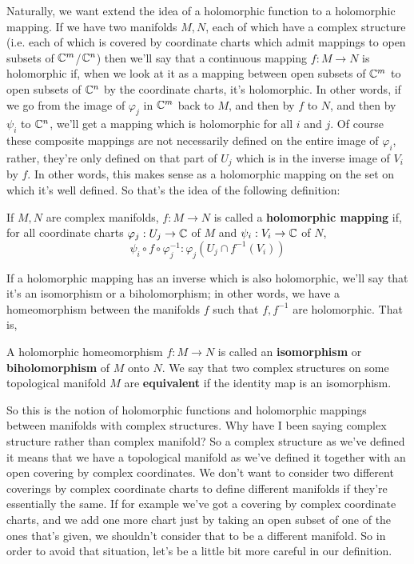 \documentclass{article}
\begin{document}
Naturally, we want extend the idea of a holomorphic function to a holomorphic mapping. If we have two manifolds \(M, N\), each of which have a complex structure (i.e. each of which is covered by coordinate charts which admit mappings to open subsets of \(\mathbb{C}^m\)/\(\mathbb{C}^n\)) then we'll say that a continuous mapping \(f: M \to N\) is holomorphic if, when we look at it as a mapping between open subsets of \(\mathbb{C}^m\) to open subsets of \(\mathbb{C}^n\) by the coordinate charts, it's holomorphic. In other words, if we go from the image of \(\varphi_j\) in \(\mathbb{C}^m\) back to \(M\), and then by \(f\) to \(N\), and then by \(\psi_i\) to \(\mathbb{C}^n\),
we'll get a mapping which is holomorphic for all \(i\) and \(j\). Of course these composite mappings are not necessarily defined on the entire image of \(\varphi_i\), rather, they're only defined on that part of \(U_j\) which is in the inverse image of \(V_i\) by \(f\). In other words, this makes sense as a holomorphic mapping on the set on which it's well defined. So that's the idea of the following definition:

\begin{definition}
If \(M, N\) are complex manifolds, \(f: M \to N\) is called a \textbf{holomorphic mapping} if, for all coordinate charts \(\varphi_j: U_j \to \mathbb{C}\) of \(M\) and \(\psi_i: V_i \to \mathbb{C}\) of \(N\),
\begin{equation}\psi_i \circ f \circ \varphi_j^{-1}: \varphi_j(U_j \cap f^{-1}(V_i))\end{equation}
\end{definition}

If a holomorphic mapping has an inverse which is also holomorphic, we'll say that it's an isomorphism or a biholomorphism; in other words, we have a homeomorphism between the manifolds \(f\) such that \(f, f^{-1}\) are holomorphic. That is,

\begin{definition}
A holomorphic homeomorphism \(f: M \to N\) is called an \textbf{isomorphism} or \textbf{biholomorphism} of \(M\) onto \(N\). We say that two complex structures on some topological manifold \(M\) are \textbf{equivalent} if the identity map is an isomorphism.
\end{definition}

So this is the notion of holomorphic functions and holomorphic mappings between manifolds with complex structures. Why have I been saying complex structure rather than complex manifold? So a complex structure as we've defined it means that we have a topological manifold as we've defined it together with an open covering by complex coordinates. We don't want to consider two different coverings by complex coordinate charts to define different manifolds if they're essentially the same. If for example we've got a covering by complex coordinate charts, and we add one more chart just by taking an open subset of one of the ones that's given, we shouldn't consider that to be a different manifold. So in order to avoid that situation, let's be a little bit more careful in our definition.
\end{document}
